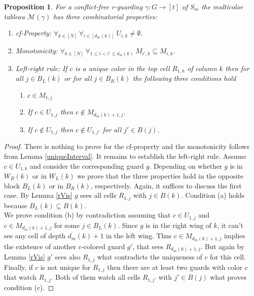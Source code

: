 \documentclass[a4paper,USenglish,numberwithinsect]{lipics}
\theoremstyle{plain}
\newtheorem{proposition}[theorem]{Proposition}
\begin{document}
\begin{proposition}
\label{r-visAdmiss}
For  a conflict-free r-guarding  $\gamma : G \rightarrow [t]$ of $S_m$
the multicolor
tableau ${\mathcal M}(\gamma)$
has  three combinatorial properties:
\begin{enumerate}
\item cf-Property: $\forall_{ k \in [N]} \ \forall_{   i \in [d_m(k)]} \
U_{i,k} \not= \emptyset$.
\item Monotonicity: $\forall_{ k \in [N]} \ \forall_{  1 \leq i < i'  \leq
d_m(k)} \ M_{i',k} \subseteq M_{i,k}$.
\item Left-right rule:   If $c$ is a unique color in the top cell
$R_{1,k}$ of column $k$ then for
all $j \in B_L(k)$ or for all $j \in B_R(k)$ the following three
conditions hold
\begin{enumerate}
\item $c \in M_{1,j}$
\item If $c  \in U_{1,j}$ then  $c  \not \in M_{d_m(k)+1,j}$.
\item If $c \not \in U_{1,j}$ then $c \not \in U_{1,j'}$ for all $j' \in
B(j)$.
\end{enumerate}
\end{enumerate}
\end{proposition}
\begin{proof}
There is nothing to prove for the cf-property and the monotonicity
follows from
Lemma \ref{uniqueInterval}.
It remains to establish the left-right rule.
Assume  $c \in U_{1,k}$ and consider  the corresponding
guard $g$.
Depending on whether $g$ is in $W_R(k)$ or in $W_L(k)$ we 
prove that the
three properties hold in the opposite block $B_L(k)$ or in $B_R(k)$, respectively. Again,
it suffices to
discuss the first case. By Lemma \ref{rVis} $g$ sees all cells $R_{1,j}$
with $j \in B(k)$.
Condition (a) holds because $B_L(k) \subseteq B(k)$. \\
We prove  condition (b) by contradiction assuming  that $c  \in U_{1,j}$
and $c \in M_{d_m(k)+1,j}$
for some $j \in B_L(k)$. Since $g$ is in the right wing
of $k$, it can't see any cell of depth $d_m(k)+1$ in the left wing. Thus
$c \in M_{d_m(k)+1,j}$ implies the existence of another c-colored guard
$g'$, that sees
$R_{d_m(k)+1,j} $. But again by Lemma \ref{rVis} $g'$  sees also
$R_{1,j}$ what contradicts
the uniqueness of $c$ for this cell. \\
Finally, if $c$ is not unique for  $R_{1,j}$ then there are at least two
guards with color $c$ that watch
$R_{1,j}$. Both of them watch all cells $R_{1,j'}$ with $j' \in
B(j)$ what proves
condition (c). \end{proof}
\end{document}
